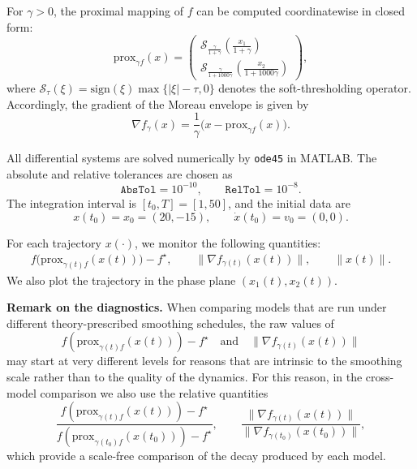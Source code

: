 \documentclass[11pt]{article}
\numberwithin{equation}{section}
\begin{document}
For $\gamma>0$, the proximal mapping of $f$ can be computed coordinatewise in closed form:
\begin{equation}
\label{eq:num-prox}
\text{prox}_{\gamma f}(x)
=
\begin{pmatrix}
\mathcal{S}_{\frac{\gamma}{1+\gamma}}\!\left(\frac{x_1}{1+\gamma}\right)\\[1ex]
\mathcal{S}_{\frac{\gamma}{1+1000\gamma}}\!\left(\frac{x_2}{1+1000\gamma}\right)
\end{pmatrix},
\end{equation}
where $\mathcal{S}_\tau(\xi)=\mathrm{sign}(\xi)\max\{|\xi|-\tau,0\}$ denotes the soft-thresholding operator. Accordingly, the gradient of the Moreau envelope is given by
\begin{equation}
\label{eq:num-grad-moreau}
\nabla f_\gamma(x)=\frac{1}{\gamma}\bigl(x-\text{prox}_{\gamma f}(x)\bigr).
\end{equation}

All differential systems are solved numerically by \texttt{ode45} in MATLAB. The absolute and relative tolerances are chosen as
\[
\texttt{AbsTol}=10^{-10},
\qquad
\texttt{RelTol}=10^{-8}.
\]
The integration interval is $[t_0,T]=[1,50]$, and the initial data are
\[
x(t_0)=x_0=(20,-15),
\qquad
\dot x(t_0)=v_0=(0,0).
\]

For each trajectory $x(\cdot)$, we monitor the following quantities:
\begin{align}
\label{eq:num-gap}
f\bigl(\text{prox}_{\gamma(t)f}(x(t))\bigr)-f^\star,
\qquad
\|\nabla f_{\gamma(t)}(x(t))\|,
\qquad
\|x(t)\|.
\end{align}
We also plot the trajectory in the phase plane $(x_1(t),x_2(t))$.

\medskip

\noindent
\textbf{Remark on the diagnostics.}
When comparing models that are run under different theory-prescribed smoothing schedules, the raw values of
\[
f(\text{prox}_{\gamma(t)f}(x(t)))-f^\star
\quad\text{and}\quad
\|\nabla f_{\gamma(t)}(x(t))\|
\]
may start at very different levels for reasons that are intrinsic to the smoothing scale rather than to the quality of the dynamics. For this reason, in the cross-model comparison we also use the relative quantities
\begin{equation}
\label{eq:relative-gap}
\frac{f(\text{prox}_{\gamma(t)f}(x(t)))-f^\star}
     {f(\text{prox}_{\gamma(t_0)f}(x(t_0)))-f^\star},
\qquad
\frac{\|\nabla f_{\gamma(t)}(x(t))\|}
     {\|\nabla f_{\gamma(t_0)}(x(t_0))\|},
\end{equation}
which provide a scale-free comparison of the decay produced by each model.
\end{document}
